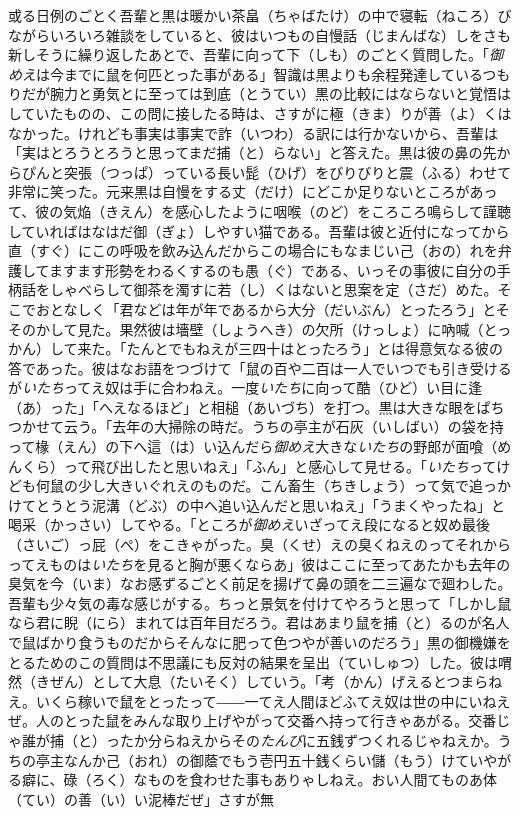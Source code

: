 \documentclass{book}
\begin{document}
或る日例のごとく吾輩と黒は暖かい茶畠（ちゃばたけ）の中で寝転（ねころ）びながらいろいろ雑談をしていると、彼はいつもの自慢話（じまんばな）しをさも新しそうに繰り返したあとで、吾輩に向って下（しも）のごとく質問した。「\emph{御めえ}は今までに鼠を何匹とった事がある」智識は黒よりも余程発達しているつもりだが腕力と勇気とに至っては到底（とうてい）黒の比較にはならないと覚悟はしていたものの、この問に接したる時は、さすがに極（きま）りが善（よ）くはなかった。けれども事実は事実で詐（いつわ）る訳には行かないから、吾輩は「実はとろうとろうと思ってまだ捕（と）らない」と答えた。黒は彼の鼻の先からぴんと突張（つっぱ）っている長い髭（ひげ）をびりびりと震（ふる）わせて非常に笑った。元来黒は自慢をする丈（だけ）にどこか足りないところがあって、彼の気焔（きえん）を感心したように咽喉（のど）をころころ鳴らして謹聴していればはなはだ御（ぎょ）しやすい猫である。吾輩は彼と近付になってから直（すぐ）にこの呼吸を飲み込んだからこの場合にもなまじい己（おの）れを弁護してますます形勢をわるくするのも愚（ぐ）である、いっその事彼に自分の手柄話をしゃべらして御茶を濁すに若（し）くはないと思案を定（さだ）めた。そこでおとなしく「君などは年が年であるから大分（だいぶん）とったろう」とそそのかして見た。果然彼は墻壁（しょうへき）の欠所（けっしょ）に吶喊（とっかん）して来た。「たんとでもねえが三四十はとったろう」とは得意気なる彼の答であった。彼はなお語をつづけて「鼠の百や二百は一人でいつでも引き受けるが\emph{いたち}ってえ奴は手に合わねえ。一度\emph{いたち}に向って酷（ひど）い目に逢（あ）った」「へえなるほど」と相槌（あいづち）を打つ。黒は大きな眼をぱちつかせて云う。「去年の大掃除の時だ。うちの亭主が石灰（いしばい）の袋を持って椽（えん）の下へ這（は）い込んだら\emph{御めえ}大きな\emph{いたち}の野郎が面喰（めんくら）って飛び出したと思いねえ」「ふん」と感心して見せる。「\emph{いたち}ってけども何鼠の少し大きいぐれえのものだ。こん畜生（ちきしょう）って気で追っかけてとうとう泥溝（どぶ）の中へ追い込んだと思いねえ」「うまくやったね」と喝采（かっさい）してやる。「ところが\emph{御めえ}いざってえ段になると奴め最後（さいご）っ屁（ぺ）をこきゃがった。臭（くせ）えの臭くねえのってそれからってえものは\emph{いたち}を見ると胸が悪くならあ」彼はここに至ってあたかも去年の臭気を今（いま）なお感ずるごとく前足を揚げて鼻の頭を二三遍なで廻わした。吾輩も少々気の毒な感じがする。ちっと景気を付けてやろうと思って「しかし鼠なら君に睨（にら）まれては百年目だろう。君はあまり鼠を捕（と）るのが名人で鼠ばかり食うものだからそんなに肥って色つやが善いのだろう」黒の御機嫌をとるためのこの質問は不思議にも反対の結果を呈出（ていしゅつ）した。彼は喟然（きぜん）として大息（たいそく）していう。「考（かん）げえるとつまらねえ。いくら稼いで鼠をとったって――一てえ人間ほどふてえ奴は世の中にいねえぜ。人のとった鼠をみんな取り上げやがって交番へ持って行きゃあがる。交番じゃ誰が捕（と）ったか分らねえからその\emph{たんび}に五銭ずつくれるじゃねえか。うちの亭主なんか己（おれ）の御蔭でもう壱円五十銭くらい儲（もう）けていやがる癖に、碌（ろく）なものを食わせた事もありゃしねえ。おい人間てものあ体（てい）の善（い）い泥棒だぜ」さすが無
\end{document}
